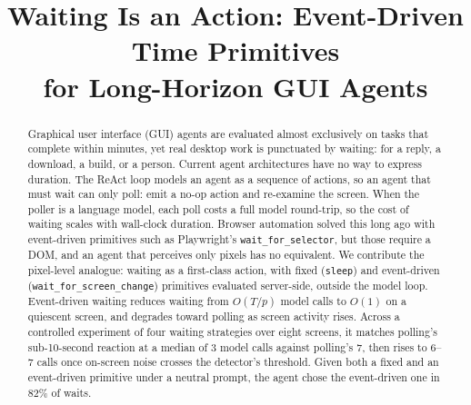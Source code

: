 \documentclass[conference]{IEEEtran}
\begin{document}
\title{Waiting Is an Action: Event-Driven Time Primitives\\ for Long-Horizon GUI Agents}

\author{
\and
{}
\and
{}
}

\maketitle

\begin{abstract}
Graphical user interface (GUI) agents are evaluated almost exclusively on tasks
that complete within minutes, yet real desktop work is punctuated by waiting:
for a reply, a download, a build, or a person. Current agent architectures have
no way to express duration. The ReAct loop models an agent as a sequence of
actions, so an agent that must wait can only poll: emit a no-op action and
re-examine the screen. When the poller is a language model, each poll costs a
full model round-trip, so the cost of waiting scales with wall-clock duration.
Browser automation solved this long ago with event-driven primitives such as
Playwright's \texttt{wait\_for\_selector}, but those require a DOM, and an agent
that perceives only pixels has no equivalent. We contribute the pixel-level
analogue: waiting as a first-class action, with fixed (\texttt{sleep}) and
event-driven (\texttt{wait\_for\_screen\_change}) primitives evaluated
server-side, outside the model loop. Event-driven waiting reduces waiting from
$O(T/p)$ model calls to $O(1)$ on a quiescent screen, and degrades toward polling
as screen activity rises. Across a controlled experiment of four waiting
strategies over eight screens, it matches polling's sub-10-second reaction at a
median of $3$ model calls against polling's $7$, then rises to $6$--$7$ calls
once on-screen noise crosses the detector's threshold. Given both a fixed and an
event-driven primitive under a neutral prompt, the agent chose the event-driven
one in $82\%$ of waits.
\end{abstract}
\end{document}

